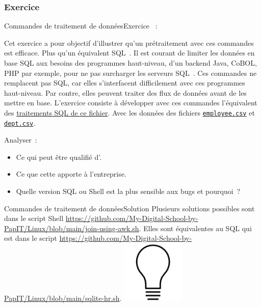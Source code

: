 \documentclass{beamer}
\begin{document}
    \subsubsection{Exercice}\label{subsubsec:data-exercice}
    \begin{frame}{Commandes de traitement de données}{Exercice \execcounterdispinc{}~:}
        \begin{footnotesize}
            Cet exercice a pour objectif d'illustrer qu'un prétraitement avec ces commandes est efficace.
            Plus qu'un équivalent SQL~.
            \bigbreak
            Il est courant de limiter les données en base SQL aux besoins des programmes haut-niveau, d'un backend Java, CoBOL, PHP par exemple, pour ne pas surcharger les serveurs SQL~.
            \bigbreak
            Ces commandes ne remplacent pas SQL, car elles s'interfacent difficilement avec ces programmes haut-niveau.
            \bigbreak
            Par contre, elles peuvent traiter des flux de données avant de les mettre en base.
            L'exercice consiste à développer avec ces commandes l'équivalent des \href{https://github.com/My-Digital-School-by-PapIT/Linux/blob/main/sqlite-hr.sh}{traitements SQL de ce fichier}.
            Avec les données des fichiers \href{https://github.com/My-Digital-School-by-PapIT/Linux/blob/main/employee.csv}{\lstinline{employee.csv}} et \href{https://github.com/My-Digital-School-by-PapIT/Linux/blob/main/dept.csv}{\lstinline{dept.csv}}.

            Analyser~:
            \begin{itemize}
                \item Ce qui peut être qualifié d'.
                \item Ce que cette  apporte à l'entreprise.
                \item Quelle version SQL ou Shell est la plus sensible aux bugs et pourquoi~?
            \end{itemize}
        \end{footnotesize}
    \end{frame}

    \begin{frame}{Commandes de traitement de données}{Solution}
        Plusieurs solutions possibles sont dans le script Shell \url{https://github.com/My-Digital-School-by-PapIT/Linux/blob/main/join-using-awk.sh}.
        \bigbreak
        Elles sont équivalentes au SQL qui est dans le script \url{https://github.com/My-Digital-School-by-PapIT/Linux/blob/main/sqlite-hr.sh}.
        \bigbreak
        \centering
        \includegraphics[width=3cm]{image/bulb}
    \end{frame}
\end{document}
